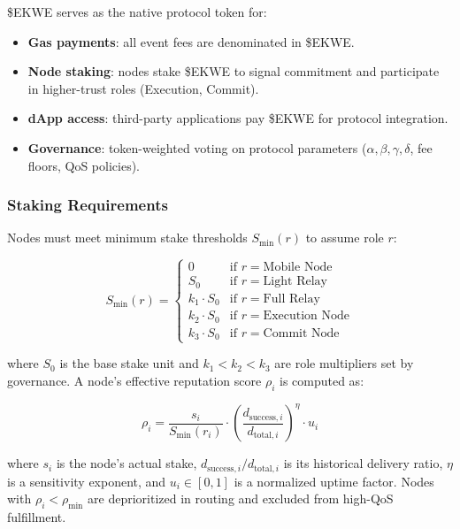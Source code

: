 \documentclass[11pt,a4paper]{article}
\begin{document}
\$EKWE serves as the native protocol token for:
\begin{itemize}[nosep]
  \item \textbf{Gas payments}: all event fees are denominated in \$EKWE.
  \item \textbf{Node staking}: nodes stake \$EKWE to signal commitment and participate in higher-trust roles (Execution, Commit).
  \item \textbf{dApp access}: third-party applications pay \$EKWE for protocol integration.
  \item \textbf{Governance}: token-weighted voting on protocol parameters ($\alpha, \beta, \gamma, \delta$, fee floors, QoS policies).
\end{itemize}

\subsubsection{Staking Requirements}

Nodes must meet minimum stake thresholds $S_{\min}(r)$ to assume role $r$:

\begin{equation}
S_{\min}(r) = \begin{cases}
  0 & \text{if } r = \text{Mobile Node} \\
  S_0 & \text{if } r = \text{Light Relay} \\
  k_1 \cdot S_0 & \text{if } r = \text{Full Relay} \\
  k_2 \cdot S_0 & \text{if } r = \text{Execution Node} \\
  k_3 \cdot S_0 & \text{if } r = \text{Commit Node}
\end{cases}
\label{eq:staking}
\end{equation}

where $S_0$ is the base stake unit and $k_1 < k_2 < k_3$ are role multipliers set by governance. A node's effective reputation score $\rho_i$ is computed as:

\begin{equation}
\rho_i = \frac{s_i}{S_{\min}(r_i)} \cdot \left( \frac{d_{\text{success},i}}{d_{\text{total},i}} \right)^{\eta} \cdot u_i
\label{eq:reputation}
\end{equation}

where $s_i$ is the node's actual stake, $d_{\text{success},i} / d_{\text{total},i}$ is its historical delivery ratio, $\eta$ is a sensitivity exponent, and $u_i \in [0, 1]$ is a normalized uptime factor. Nodes with $\rho_i < \rho_{\min}$ are deprioritized in routing and excluded from high-QoS fulfillment.
\end{document}
